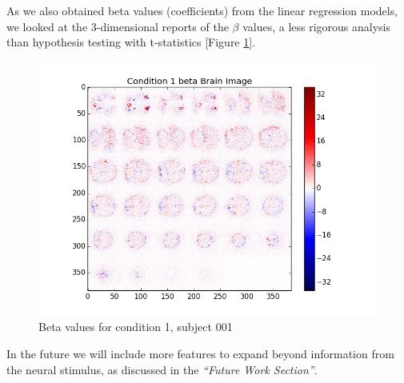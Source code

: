 As we also obtained beta values (coefficients) from the linear regression models, we looked at the 3-dimensional reports of the $\beta$ values, a less rigorous analysis than hypothesis testing with t-statistics [Figure \ref{fig:con1_beta_brain}]. 

\begin{figure}[ht]
\centering
\includegraphics[scale=.5]{images/mr_cond1_beta_brain}    
\caption{Beta values for condition 1, subject 001}
\label{fig:con1_beta_brain}
\end{figure}


In the future we will include more features to expand beyond information from the neural stimulus, as discussed in the \textit{“Future Work Section”}. 
